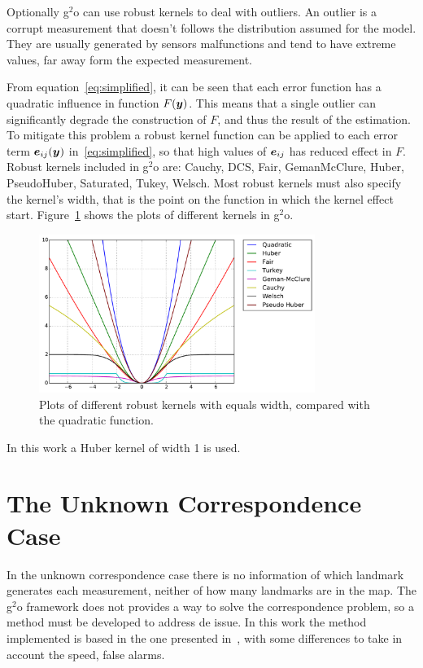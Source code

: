 Optionally g$^2$o can use robust kernels to deal with outliers. An outlier is a corrupt measurement that doesn't follows the distribution assumed for the model. They are usually generated by sensors malfunctions and tend to have extreme values, far away form the expected measurement. 

From equation~\eqref{eq:simplified}, it can be seen that each error function has a quadratic influence in function $F(\boldsymbol{y})$. This means that a single outlier can significantly degrade the construction of $F$, and thus the result of the estimation. To mitigate this problem a robust kernel function can be applied to each error term $\boldsymbol{e}_{ij}(\boldsymbol{y})$ in~\eqref{eq:simplified}, so that high values of $\boldsymbol{e}_{ij}$ has reduced effect in $F$. Robust kernels included in g$^2$o are: Cauchy, DCS, Fair, GemanMcClure, Huber, PseudoHuber, Saturated, Tukey, Welsch. Most robust kernels must also specify the kernel's width, that is the point on the function in which the kernel effect start. Figure~\ref{fig:kernels} shows the plots of different kernels in g$^2$o. 

\begin{figure}[htbp!]
    \centering
    \includegraphics[width=0.8\textwidth]{imagenes/kernels.pdf}
    \caption{Plots of different robust kernels with equals width, compared with the quadratic function.}
    \label{fig:kernels}
\end{figure} 

In this work a Huber kernel of width 1 is used.

\section{The Unknown Correspondence Case}

In the unknown correspondence case there is no information of which landmark generates each measurement, neither of how many landmarks are in the map. The g$^2$o framework does not provides a way to solve the correspondence problem, so a method must be developed to address de issue. In this work the method implemented is based in the one presented in~\cite{graphslam}, with some differences to take in account the speed,  false alarms. 


